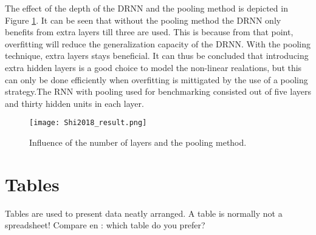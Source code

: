The effect of the depth of the DRNN and the pooling method is depicted in Figure \ref{fig:Shi2018_result}. It can be seen that without the pooling method the DRNN only benefits from extra layers till three are used. This is because from that point, overfitting will reduce the generalization capacity of the DRNN. With the pooling technique, extra layers stays beneficial. It can thus be concluded that introducing extra hidden layers is a good choice to model the non-linear realations, but this can only be done efficiently when overfitting is mittigated by the use of a pooling strategy.The RNN with pooling used for benchmarking consisted out of five layers and thirty hidden units in each layer.

\begin{figure}[h!]
	\centering
	\texttt{[image: Shi2018\_result.png]}
	\caption{Influence of the number of layers and the pooling method.}
	\label{fig:Shi2018_result}
\end{figure}














\section{Tables}
Tables are used to present data neatly arranged. A table is normally
not a spreadsheet! Compare  en : which table do
you prefer?

